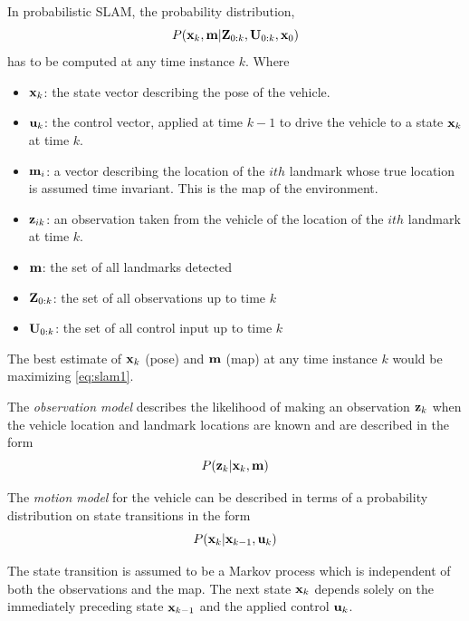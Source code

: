 In probabilistic SLAM, the probability distribution, 
\begin{equation} \label{eq:slam1}
P({\bf x}_{k},{\bf m}\vert {\bf Z}_{0:k},{\bf U}_{0:k},{\bf x}_{0})
\end{equation}
has to be computed at any time instance $k$. Where
\begin{itemize}
	\item ${\bf x}_k$: the state vector describing the pose of the vehicle.
	
	\item ${\bf u}_k$: the control vector, applied at time $k - 1$ to drive the vehicle to a state ${\bf x}_k$ at time $k$.
	
	\item ${\bf m}_i$: a vector describing the location of the $ith$ landmark whose true location is assumed time invariant. This is the map of the environment.
	
	\item ${\bf z}_{ik}$: an observation taken from the vehicle of the location of the $ith$ landmark at time $k$.
	
	\item ${\bf m}$: the set of all landmarks detected
	
	\item ${\bf Z}_{0:k}$: the set of all observations up to time $k$
	
	\item ${\bf U}_{0:k}$: the set of all control input up to time $k$
	
\end{itemize}

The best estimate of ${\bf x}_k$ (pose) and ${\bf m}$ (map) at any time instance $k$ would be maximizing \ref{eq:slam1}.

The \textit{observation model} describes the likelihood of making an observation ${\bf z}_k$ when the vehicle location and landmark locations are known and are described in the form
\begin{equation}
P({\bf z}_{k}\vert {\bf x}_{k},{\bf m})
\end{equation}

The\textit{ motion model} for the vehicle can be described in terms of a probability distribution on state transitions in the form
\begin{equation}
P({\bf x}_{k}\vert {\bf x}_{k-1},{\bf u}_{k})
\end{equation}

The state transition is assumed to be a Markov process which is independent of both the observations and the map. The next state ${\bf x}_k$ depends solely on the immediately preceding state ${\bf x}_{k-1}$ and the applied control ${\bf u}_k$.

